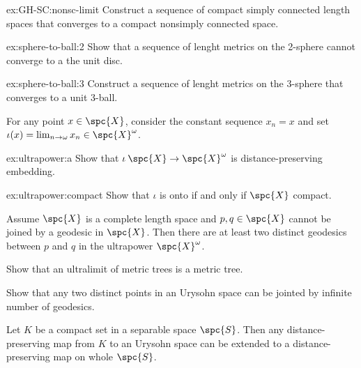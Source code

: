 \begin{subthm}{ex:GH-SC:nonsc-limit}
Construct a sequence of compact simply connected length spaces that converges to a compact nonsimply connected space.
\end{subthm}


\vskip 50mm

\noindent \begin{subthm}{ex:sphere-to-ball:2}
Show that a sequence of lenght metrics on the 2-sphere cannot converge to a the unit disc.
\end{subthm}

\begin{subthm}{ex:sphere-to-ball:3}
Construct a sequence of lenght metrics on the 3-sphere that converges to a unit 3-ball.
\end{subthm}


\newpage
\pagestyle{empty}

\noindent For any point $x\in \spc{X}$, consider the constant sequence $x_n=x$
and set $\iota(x)=\lim_{n\to\omega}x_n\in\spc{X}^\omega$.

\begin{subthm}{ex:ultrapower:a}
Show that $\iota\:\spc{X}\to\spc{X}^\omega$ is distance-preserving embedding.
\end{subthm}

\begin{subthm}{ex:ultrapower:compact} 
Show that $\iota$ is onto if and only if $\spc{X}$ compact.
\end{subthm}



\vskip 50mm

\noindent Assume $\spc{X}$ is a complete length space 
and $p,q\in\spc{X}$ cannot be joined by a geodesic in $\spc{X}$.  
Then there are at least two distinct geodesics between $p$ and $q$ 
in the ultrapower $\spc{X}^\omega$.

\vskip 50mm

\noindent Show that an ultralimit of metric trees is a metric tree. 

\newpage
\pagestyle{empty}

\noindent Show that any two distinct points in an Urysohn space can be jointed by infinite number of geodesics.

\vskip 50mm

\noindent 
Let $K$ be a compact set in a separable space $\spc{S}$.
Then any distance-preserving map from $K$ to an Urysohn space can be extended to 
a distance-preserving map on whole $\spc{S}$.


